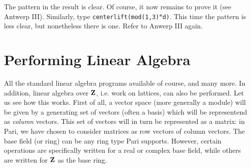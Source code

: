 The pattern in the result is clear. Of course, it now remains to prove it
(see Antwerp III). Similarly, type {\tt centerlift(mod(1,3)$*$d)}. This time
the pattern is less clear, but nonetheless there is one. Refer to Anwerp III
again.
\medskip
\section{Performing Linear Algebra}
\medskip
All the standard linear algebra programs available of course, and many more.
In addition, linear algebra over ${\bf Z}$, i.e. work on lattices, can also be
performed. Let us see how this works.
First of all, a vector space (more generally a module) will be given by a
generating set of vectors (often a basis) which will be representend as
{\it column} vectors. This set of vectors will in turn be represented as
a matrix: in Pari, we have chosen to consider matrices as row vectors of
column vectors. The base field (or ring) can be any ring type Pari supports.
However, certain operations are specifically written for a real or complex
base field, while others are written for ${\bf Z}$ as the base ring.





